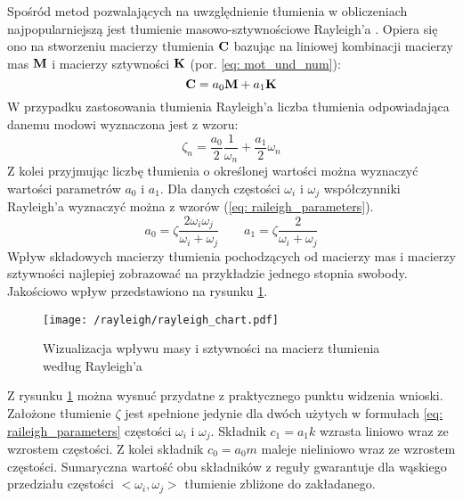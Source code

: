 Spośród metod pozwalających na uwzględnienie tłumienia w obliczeniach najpopularniejszą jest tłumienie masowo-sztywnościowe Rayleigh'a \parencite{Chopra2012a}. Opiera się ono na stworzeniu macierzy tłumienia $\mathbf{C}$ bazując na liniowej kombinacji macierzy mas $\mathbf{M}$ i macierzy sztywności $\mathbf{K}$ (por. \ref{eq: mot_und_num}):
\begin{equation} \label{eq: rayleigh_damping}
	\mathbf{C}=a_0\mathbf{M}+a_1\mathbf{K}
\end{equation}
W przypadku zastosowania tłumienia Rayleigh'a liczba tłumienia odpowiadająca danemu modowi wyznaczona jest z wzoru:
\begin{equation} \label{eq: damping_rayleigh}
	\zeta_n = \frac{a_0}{2}\frac{1}{\omega_n} + \frac{a_1}{2}\omega_n
\end{equation}
Z kolei przyjmując liczbę tłumienia o określonej wartości można wyznaczyć wartości parametrów $a_0$ i $a_1$. Dla danych częstości $\omega_i$ i $\omega_j$ współczynniki Rayleigh'a wyznaczyć można z wzorów (\ref{eq: raileigh_parameters}).
\begin{equation} \label{eq: raileigh_parameters}
	a_0 = \zeta\frac{2\omega_i\omega_j}{\omega_i+\omega_j} \qquad a_1 = \zeta\frac{2}{\omega_i+\omega_j}
\end{equation}
Wpływ składowych macierzy tłumienia pochodzących od macierzy mas i macierzy sztywności najlepiej zobrazować na przykładzie jednego stopnia swobody. Jakościowo wpływ przedstawiono na rysunku \ref{fig: rayleigh_chart}.
\begin{figure}[h] 
	\centering
	\texttt{[image: /rayleigh/rayleigh\_chart.pdf]}
	\captionsetup{justification=centering}
	\caption{Wizualizacja wpływu masy i sztywności na macierz tłumienia według Rayleigh'a}
	\label{fig: rayleigh_chart}
\end{figure}
Z rysunku \ref{fig: rayleigh_chart} można wysnuć przydatne z praktycznego punktu widzenia wnioski. Założone tłumienie $\zeta$ jest spełnione jedynie dla dwóch użytych w formułach \ref{eq: raileigh_parameters} częstości $\omega_i$ i $\omega_j$. Składnik $c_1=a_1 k$ wzrasta liniowo wraz ze wzrostem częstości. Z kolei składnik $c_0 = a_0 m$ maleje nieliniowo wraz ze wzrostem częstości. Sumaryczna wartość obu składników z reguły gwarantuje dla wąskiego przedziału częstości $<\omega_i ,\omega_j>$ tłumienie zbliżone do zakładanego.





